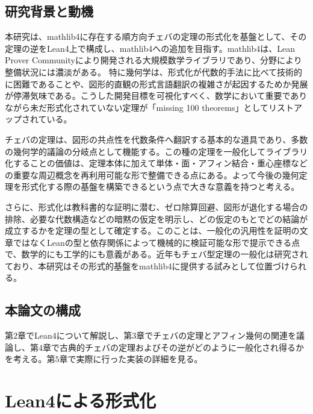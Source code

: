 \documentclass[a4paper,12pt]{bxjsbook}
\newlength{\customindent}
\newenvironment{body}{
  \par
  \begingroup
  \setlength{\leftskip}{\customindent}
  \setlength{\rightskip}{0pt}
  \setlength{\parindent}{1em}
  \setlength{\displayindent}{\customindent}
  \setlength{\displaywidth}{\dimexpr\linewidth-\customindent\relax}
}{
  \par
  \endgroup
}
\theoremstyle{theorem}
\begin{document}
    \section{研究背景と動機}
    \begin{body}
        \indent 本研究は、mathlib4に存在する順方向チェバの定理の形式化を基盤として、その定理の逆をLean4上で構成し、mathlib4への追加を目指す。mathlib4は、Lean Prover Communityにより開発される大規模数学ライブラリ\cite{LeanProverCommunity}であり、分野により整備状況には濃淡がある。
        特に幾何学は、形式化が代数的手法に比べて技術的に困難であることや、図形的直観の形式言語翻訳の複雑さが起因するためか発展が停滞気味である。こうした開発目標を可視化すべく、数学において重要でありながら未だ形式化されていない定理が「missing 100 theorems」としてリストアップされている。

        \indent チェバの定理は、図形の共点性を代数条件へ翻訳する基本的な道具であり、多数の幾何学的議論の分岐点として機能する。この種の定理を一般化してライブラリ化することの価値は、定理本体に加えて単体・面・アフィン結合・重心座標などの重要な周辺概念を再利用可能な形で整備できる点にある。よって今後の幾何定理を形式化する際の基盤を構築できるという点で大きな意義を持つと考える。

        \indent さらに、形式化は教科書的な証明に潜む、ゼロ除算回避、図形が退化する場合の排除、必要な代数構造などの暗黙の仮定を明示し、どの仮定のもとでどの結論が成立するかを定理の型として確定する。このことは、一般化の汎用性を証明の文章ではなくLeanの型と依存関係によって機械的に検証可能な形で提示できる点で、数学的にも工学的にも意義がある。近年もチェバ型定理の一般化は研究されており、本研究はその形式的基盤をmathlib4に提供する試みとして位置づけられる。
    \end{body}

    \section{本論文の構成}
    \begin{body}
        \indent  第$2$章でLean4について解説し、第$3$章でチェバの定理とアフィン幾何の関連を議論し、第$4$章で古典的チェバの定理およびその逆がどのように一般化され得るかを考える。第$5$章で実際に行った実装の詳細を見る。
    \end{body}


    \chapter{Lean4による形式化}
\end{document}
